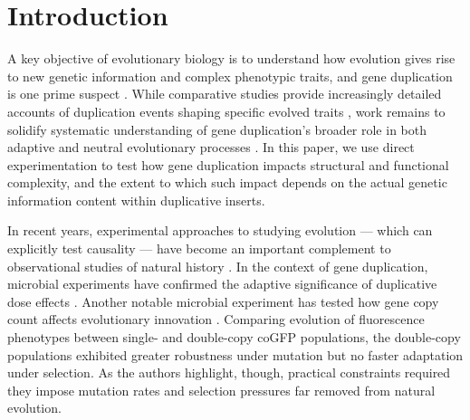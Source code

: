 \section{Introduction} \label{sec:introduction}

A key objective of evolutionary biology is to understand how evolution gives rise to new genetic information and complex phenotypic traits, and gene duplication is one prime suspect \citep{Zhang2003,Otto2000,Wagner2008,Crow:2006role,Magadum:2013wu,Metz:chromosomeDuplication1947,Hu:2010ea,Castellanos2024,Lynch2000b,Lynch2003,Birchler2022}.
While comparative studies provide increasingly detailed accounts of duplication events shaping specific evolved traits \citep{Zhang2014,teichmann_structural_1998,Teichmann:2004cz,DuBose2024,Voordeckers2012,Pougach2014,Moore2003,Ogino2015,Tasnim2024,Assis2013,Deng2010,Monson2003,Xue2026,Lynch2007Inventing}, work remains to solidify systematic understanding \citep{Welch2016} of gene duplication's broader role in both adaptive and neutral evolutionary processes \citep{Innan2010,Zhang:2003fw,Kuzmin2022}.
In this paper, we use direct experimentation to test how gene duplication impacts structural and functional complexity, and the extent to which such impact depends on the actual genetic information content within duplicative inserts.

In recent years, experimental approaches to studying evolution --- which can explicitly test causality --- have become an important complement to observational studies of natural history \citep{Kawecki2012,Elena2003}.
In the context of gene duplication, microbial experiments have confirmed the adaptive significance of duplicative dose effects \citep{Tong2025,Dhar2014,Nsvall2012}.
Another notable microbial experiment has tested how gene copy count affects evolutionary innovation \citep{mihajlovic2025direct}.
Comparing evolution of fluorescence phenotypes between single- and double-copy coGFP populations, the double-copy populations exhibited greater robustness under mutation but no faster adaptation under selection.
As the authors highlight, though, practical constraints required they impose mutation rates and selection pressures far removed from natural evolution.

